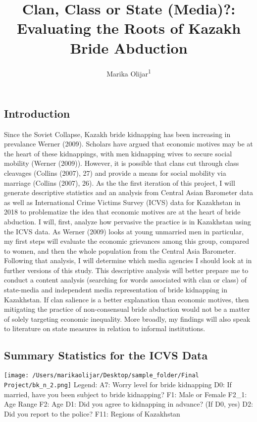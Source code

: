 \documentclass[
  english,
  man]{apa6}
\title{Clan, Class or State (Media)?: Evaluating the Roots of Kazakh Bride Abduction}
\author{Marika Olijar\textsuperscript{1}}
\date{}
\affiliation{\vspace{0.5cm}\textsuperscript{1} University of Wisconsin-Madison}
\begin{document}
\maketitle

\hypertarget{introduction}{%
\subsection{Introduction}\label{introduction}}

Since the Soviet Collapse, Kazakh bride kidnapping has been increasing in prevalance Werner (2009). Scholars have argued that economic motives may be at the heart of these kidnappings, with men kidnapping wives to secure social mobility (Werner (2009)). However, it is possible that clans cut through class cleavages (Collins (2007), 27) and provide a means for social mobility via marriage (Collins (2007), 26).
As the the first iteration of this project, I will generate descriptive statistics and an analysis from Central Asian Barometer data as well as International Crime Victims Survey (ICVS) data for Kazakhstan in 2018 to problematize the idea that economic motives are at the heart of bride abduction. I will, first, analyze how pervasive the practice is in Kazakhstan using the ICVS data. As Werner (2009) looks at young unmarried men in particular, my first steps will evaluate the economic grievances among this group, compared to women, and then the whole population from the Central Asia Barometer. Following that analysis, I will determine which media agencies I should look at in further versions of this study.
This descriptive analysis will better prepare me to conduct a content analysis (searching for words associated with clan or class) of state-media and independent media representation of bride kidnapping in Kazakhstan. If clan salience is a better explanation than economic motives, then mitigating the practice of non-consensual bride abduction would not be a matter of solely targeting economic inequality. More broadly, my findings will also speak to literature on state measures in relation to informal institutions.

\hypertarget{summary-statistics-for-the-icvs-data}{%
\subsection{Summary Statistics for the ICVS Data}\label{summary-statistics-for-the-icvs-data}}

\texttt{[image: /Users/marikaolijar/Desktop/sample\_folder/Final Project/bk\_n\_2.png]}
Legend:
A7: Worry level for bride kidnapping
D0: If married, have you been subject to bride kidnapping?
F1: Male or Female
F2\_1: Age Range
F2: Age
D1: Did you agree to kidnapping in advance? (If D0, yes)
D2: Did you report to the police?
F11: Regions of Kazakhstan
\end{document}
